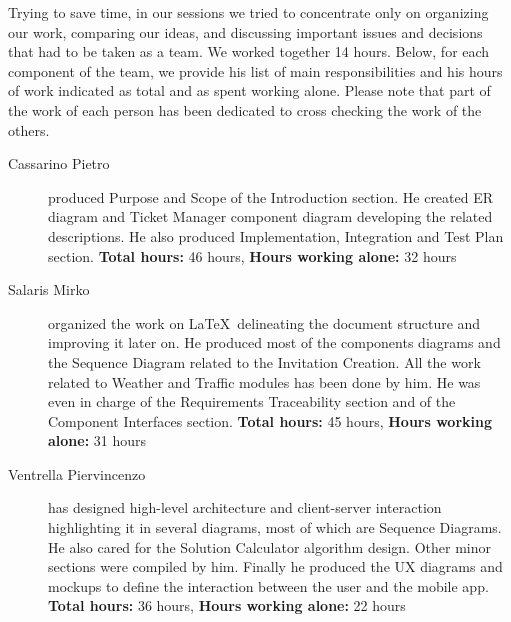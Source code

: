 Trying to save time, in our sessions we tried to concentrate only on organizing our work, comparing our ideas, and discussing important issues and decisions that had to be taken as a team. We worked together 14 hours.
\newline
Below, for each component of the team, we provide his list of main responsibilities and his hours of work indicated as total and as spent working alone. Please note that part of the work of each person has been dedicated to cross checking the work of the others.
\begin{description}
	\item[Cassarino Pietro]
		produced Purpose and Scope of the Introduction section. He created ER diagram and Ticket Manager component diagram developing the related descriptions. He also produced Implementation, Integration and Test Plan section.
		\newline
		\textbf{Total hours:} 46 hours, \textbf{Hours working alone:} 32 hours
	\item[Salaris Mirko]
		organized the work on \LaTeX\ delineating the document structure and improving it later on. He produced most of the components diagrams and the Sequence Diagram related to the Invitation Creation. All the work related to Weather and Traffic modules has been done by him. He was even in charge of the Requirements Traceability section and of the Component Interfaces section.
		\newline
		\textbf{Total hours:} 45 hours, \textbf{Hours working alone:} 31 hours
	\item[Ventrella Piervincenzo]
	has designed high-level architecture and client-server interaction highlighting it in several diagrams, most of which are Sequence Diagrams. He also cared for the Solution Calculator algorithm design. Other minor sections were compiled by him.
	Finally he produced the UX diagrams and mockups to define the interaction between the user and the mobile app. \newline
		\textbf{Total hours:} 36 hours, \textbf{Hours working alone:} 22 hours
\end{description}